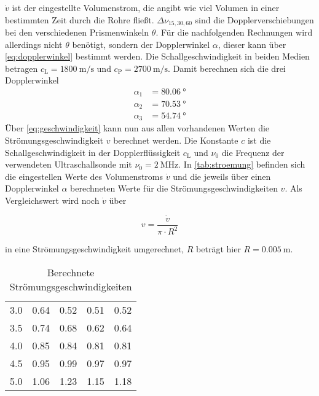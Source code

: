 $\dot{v}$ ist der eingestellte Volumenstrom, die angibt wie viel Volumen in einer bestimmten Zeit durch die Rohre fließt. 
$\Delta \nu _{15,30,60}$ sind die Dopplerverschiebungen bei den verschiedenen Prismenwinkeln $\theta$.
Für die nachfolgenden Rechnungen wird allerdings nicht $\theta$ benötigt, sondern der Dopplerwinkel $\alpha$, dieser kann über \autoref{eq:dopplerwinkel} bestimmt werden.
Die Schallgeschwindigkeit in beiden Medien betragen $c_\text{L} = \SI{1800}{\meter\per\second}$ und $c_\text{P} = \SI{2700}{\meter\per\second}$.
Damit berechnen sich die drei Dopplerwinkel
\begin{align}
\alpha_1 &= \SI{80.06}{\degree}\\
\alpha_2 &= \SI{70.53}{\degree}\\
\alpha_3 &= \SI{54.74}{\degree}
\end{align}
Über \autoref{eq:geschwindigkeit} kann nun aus allen vorhandenen Werten die Strömungsgeschwindigkeit $v$ berechnet werden.
Die Konstante $c$ ist die Schallgeschwindigkeit in der Dopplerflüssigkeit $c_\text{L}$ und $\nu _0$ die Frequenz der verwendeten Ultraschallsonde mit $\nu _0 = \SI{2}{\mega\hertz}$.
In \autoref{tab:stroemung} befinden sich die eingestellen Werte des Volumenstroms $\dot{v}$ und die jeweils über einen Dopplerwinkel $\alpha$ berechneten Werte für die Strömungsgeschwindigkeiten $v$.
Als Vergleichswert wird noch $\dot{v}$ über 

\begin{equation}
v = \frac{\dot{v}}{\pi \cdot R^2}
\end{equation}

in eine Strömungsgeschwindigkeit umgerechnet, $R$ beträgt hier $R = \SI{0.005}{\meter}$.

\begin{table}
    \centering
    \caption{Berechnete Strömungsgeschwindigkeiten}
    \begin{tabular}{S[table-format=1.1] S[table-format=1.2] S[table-format=1.2] S[table-format=1.2] S[table-format=1.2]}
        \toprule
         &  &  & & \\
         & 0.64 & 0.52 & 0.51 & 0.52 \\
        3.5 & 0.74 & 0.68 & 0.62 & 0.64 \\
        4.0 & 0.85 & 0.84 & 0.81 & 0.81 \\
        4.5 & 0.95 & 0.99 & 0.97 & 0.97 \\
        5.0 & 1.06 & 1.23 & 1.15 & 1.18 \\
        \bottomrule
    \end{tabular}
    \label{tab:stroemung}
\end{table}


